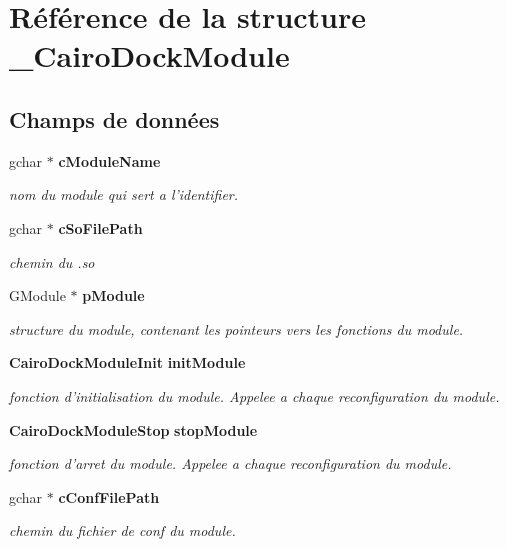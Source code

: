 \section{Référence de la structure \_\-CairoDockModule}
\label{struct__CairoDockModule}
\subsection*{Champs de données}
\begin{CompactItemize}
\item 
gchar $\ast$ {\bf cModuleName}
\begin{CompactList}\small\item\em nom du module qui sert a l'identifier. \item\end{CompactList}\item 
gchar $\ast$ {\bf cSoFilePath}
\begin{CompactList}\small\item\em chemin du .so \item\end{CompactList}\item 
GModule $\ast$ {\bf pModule}
\begin{CompactList}\small\item\em structure du module, contenant les pointeurs vers les fonctions du module. \item\end{CompactList}\item 
{\bf CairoDockModuleInit} {\bf initModule}
\begin{CompactList}\small\item\em fonction d'initialisation du module. Appelee a chaque reconfiguration du module. \item\end{CompactList}\item 
{\bf CairoDockModuleStop} {\bf stopModule}
\begin{CompactList}\small\item\em fonction d'arret du module. Appelee a chaque reconfiguration du module. \item\end{CompactList}\item 
gchar $\ast$ {\bf cConfFilePath}
\begin{CompactList}\small\item\em chemin du fichier de conf du module. \item\end{CompactList}\item 

\end{CompactItemize}
